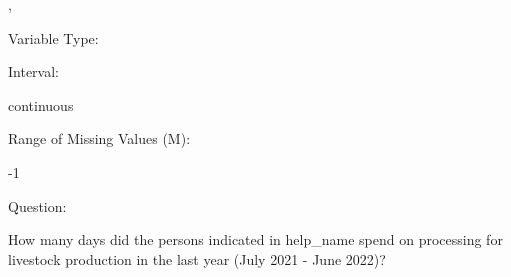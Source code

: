\documentclass[
]{article}
\begin{document}
,

\begin{minipage}[t]{0.3\linewidth}

\colorbox{mypink1}{}

\end{minipage}%
\begin{minipage}[t]{0.7\linewidth}

\colorbox{mypink1}{\makebox[\textwidth]{\strut\bfseries\color{black}  
 }}

\end{minipage}

\begin{minipage}[t]{0.3\linewidth}

Variable Type:

\end{minipage}%
\begin{minipage}[t]{0.7\linewidth}

\end{minipage}

\begin{minipage}[t]{0.3\linewidth}

Interval:

\end{minipage}%
\begin{minipage}[t]{0.7\linewidth}

continuous

\end{minipage}

\begin{minipage}[t]{0.3\linewidth}

Range of Missing Values (M):

\end{minipage}%
\begin{minipage}[t]{0.7\linewidth}

-1

\end{minipage}

\begin{minipage}[t]{0.3\linewidth}

Question:

\end{minipage}%
\begin{minipage}[t]{0.7\linewidth}

How many days did the persons indicated in help\_name spend on
processing for livestock production in the last year (July 2021 - June
2022)?

\end{minipage}
\end{document}

